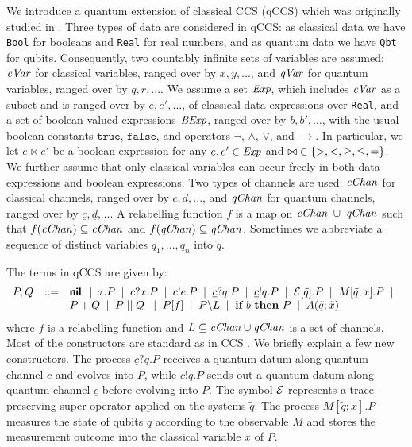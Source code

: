 \documentclass[a4paper,runningheads]{llncs}
\def\ra{\ensuremath{\rightarrow}}
\newcommand{\qc}{\underline{c}}
\newcommand{\qd}{\underline{d}}
\newcommand{\cVar}{{\it cVar}}
\newcommand{\qVar}{{\it qVar}}
\newcommand{\cChan}{{\it cChan}}
\newcommand{\qChan}{{\it qChan}}
\newcommand{\CE}{{\cal E}}
\newcommand{\ifthen}[2]{{\textbf{if} ~#1~ \textbf{then} ~#2}}
\begin{document}
We introduce a quantum extension of classical CCS (qCCS) which was originally studied in \cite{FDJY07,YFDJ09,FDY11}. Three types of data are considered in qCCS: as classical data we have \texttt{Bool} for booleans and \texttt{Real} for real numbers, and as quantum data we have \texttt{Qbt} for qubits. Consequently,
two countably infinite sets of variables are assumed: $\cVar$ for classical variables, ranged over by $x,y,...$, and $\qVar$ for quantum variables, ranged over by $q,r,...$.
We assume a set ${\it Exp}$, which includes $\cVar$ as a subset and is ranged over by $e,e',\dots$,  of classical data expressions over
\texttt{Real}, and a set of boolean-valued expressions ${\it BExp}$, ranged over by $b, b',\dots$, with the usual  boolean constants $\texttt{true}$, $\texttt{false}$, and operators
$\neg$, $\wedge$, $\vee$, and $\ra$. In particular, we let $e\bowtie e'$ be a boolean expression for any $e,e'\in {\it Exp}$ and ${\bowtie} \in\{ {>, <, \geq, \leq, =} \}$.
We further assume that only classical variables can occur freely in both data expressions and boolean expressions.
Two types of channels are used: $\cChan$ for classical channels, ranged over by $c,d,...$, and $\qChan$ for quantum channels, ranged over by $\qc,\qd$,.... A relabelling function $f$ is a map on $\cChan\; \cup\; \qChan$ such that $f(\cChan)\subseteq \cChan$ and $f(\qChan)\subseteq \qChan$.
Sometimes we abbreviate a sequence of distinct variables $q_1,...,q_n$ into $\tilde{q}$.

The terms in qCCS are given by:
\[\begin{array}{rcl}
P,Q &::=& \Cnil \BNFsep \tau.P \BNFsep c?x.P \BNFsep c!e.P
\BNFsep \qc?q.P \BNFsep
\qc!q.P \BNFsep \CE[\tilde{q}].P
\BNFsep M[\tilde{q};x].P \BNFsep \\
& & P + Q \BNFsep  P \Cpar Q\;
\BNFsep P[f] \BNFsep P\backslash L \BNFsep \ifthen{b}{P} \BNFsep
A(\tilde{q};\tilde{x})
\end{array}\]
where $f$ is a relabelling function and $L\subseteq \cChan\cup \qChan$ is a set of channels.
Most of the constructors are standard as in CCS \cite{ccs}.
We briefly explain a few new constructors. The process $\qc?q.P$ receives a quantum datum along quantum channel $\qc$ and evolves into $P$, while $\qc!q.P$ sends out a quantum datum along quantum channel $\qc$ before evolving into $P$. The symbol $\CE$ represents a trace-preserving super-operator applied on the systems $\tilde{q}$. The process $M[\widetilde{q};x].P$ measures the state of qubits $\widetilde{q}$
according to the observable $M$ and stores the measurement outcome into the
classical variable $x$ of $P$.
\end{document}
